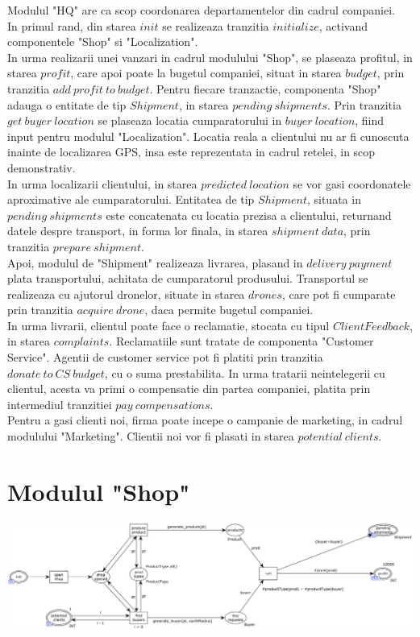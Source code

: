 \begin{spacing}{1.5}
Modulul "HQ" are ca scop coordonarea departamentelor din cadrul companiei.\\
In primul rand, din starea $init$ se realizeaza tranzitia $initialize$, activand componentele "Shop" si
"Localization".\\
In urma realizarii unei vanzari in cadrul modulului "Shop", se plaseaza profitul, in starea $profit$, care
apoi poate la bugetul companiei, situat in starea $budget$, prin tranzitia $add\ profit\ to\ budget$.
Pentru fiecare tranzactie, componenta "Shop" adauga o entitate de tip $Shipment$, in starea
$pending\ shipments$. Prin tranzitia $get\ buyer\ location$ se plaseaza locatia cumparatorului in
$buyer\ location$, fiind input pentru modulul "Localization". Locatia reala a clientului nu ar fi cunoscuta
inainte de localizarea GPS, insa este reprezentata in cadrul retelei, in scop demonstrativ.\\
In urma localizarii clientului, in starea $predicted\ location$ se vor gasi coordonatele aproximative ale
cumparatorului. Entitatea de tip $Shipment$, situata in $pending\ shipments$ este concatenata cu locatia
prezisa a clientului, returnand datele despre transport, in forma lor finala, in starea $shipment\ data$,
prin tranzitia $prepare\ shipment$.\\
Apoi, modulul de "Shipment" realizeaza livrarea, plasand in $delivery\ payment$ plata transportului, achitata
de cumparatorul produsului. Transportul se realizeaza cu ajutorul dronelor, situate in starea $drones$,
care pot fi cumparate prin tranzitia $acquire\ drone$, daca permite bugetul companiei.\\
In urma livrarii, clientul poate face o reclamatie, stocata cu tipul $ClientFeedback$, in starea $complaints$.
Reclamatiile sunt tratate de componenta "Customer Service". Agentii de customer service pot fi platiti prin
tranzitia $donate\ to\ CS\ budget$, cu o suma prestabilita. In urma tratarii neintelegerii cu clientul,
acesta va primi o compensatie din partea companiei, platita prin intermediul tranzitiei $pay\ compensations$.\\
Pentru a gasi clienti noi, firma poate incepe o campanie de marketing, in cadrul modulului "Marketing".
Clientii noi vor fi plasati in starea $potential\ clients$.

\section{Modulul "Shop"}

\includegraphics[width=\textwidth]{./Parts/Chapter1/Shop.png}


\end{spacing}
